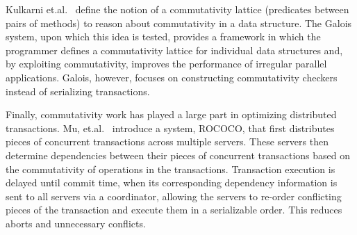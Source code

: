 Kulkarni et.al.~\cite{galois} define the notion of a commutativity lattice (predicates between pairs of methods) to reason about commutativity in a data structure. The Galois system, upon which this idea is tested, provides a framework in which the programmer defines a commutativity lattice for individual data structures and, by exploiting commutativity, improves the performance of irregular parallel applications. Galois, however, focuses on constructing commutativity checkers instead of serializing transactions.

Finally, commutativity work has played a large part in optimizing distributed transactions. Mu, et.al.~\cite{distributed} introduce a system, ROCOCO, that first distributes pieces of concurrent transactions across multiple servers. These servers then determine dependencies between their pieces of concurrent transactions based on the commutativity of operations in the transactions.
 Transaction execution is delayed until commit time, when its corresponding dependency information is sent to all servers via a coordinator, allowing the servers to re-order conflicting pieces of the transaction and execute them in a serializable order. This reduces aborts and unnecessary conflicts.
